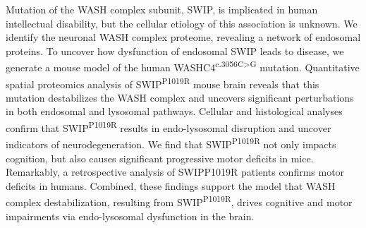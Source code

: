 
\justify
Mutation of the WASH complex subunit, SWIP, is implicated in human intellectual
disability, but the cellular etiology of this association is unknown. We
identify the neuronal WASH complex proteome, revealing a network of endosomal
proteins. To uncover how dysfunction of endosomal SWIP leads to disease, we
generate a mouse model of the human WASHC4\textsuperscript{c.3056C>G} mutation. 
Quantitative spatial proteomics analysis of SWIP\textsuperscript{P1019R} mouse brain reveals that this mutation destabilizes the WASH complex and uncovers significant  perturbations in both endosomal and lysosomal pathways. 
Cellular and histological analyses confirm that SWIP\textsuperscript{P1019R} results in  endo-lysosomal disruption and uncover indicators of
neurodegeneration. We find that SWIP\textsuperscript{P1019R} not only impacts
cognition, but also causes significant progressive motor deficits in mice.
Remarkably, a retrospective analysis of SWIPP1019R patients confirms motor
deficits in humans. Combined, these findings support the model that WASH complex
destabilization, resulting from SWIP\textsuperscript{P1019R}, drives cognitive
and motor impairments via endo-lysosomal dysfunction in the brain.
